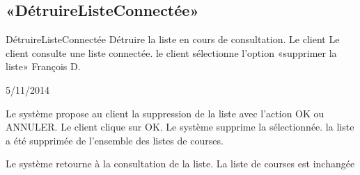 \subsection{«DétruireListeConnectée»}

\startCU
\nom DétruireListeConnectée
\but Détruire la liste en cours de consultation.
\acteur Le client
\precondition Le client consulte une liste connectée.
\declenchement le client sélectionne l'option «supprimer la liste»
\auteur François D.
\date 05/11/2014

\nominal %
\startnominal
\etape Le système propose au client la suppression de la liste avec l'action OK ou ANNULER.
 Le client clique sur OK.
\etape Le système supprime la sélectionnée.
\stopnominal
\postcondition la liste a été supprimée de l'ensemble des listes de courses.


\exception 
{} 
  \etape Le système retourne à la consultation de la liste.
\stopcondition
\postcondition La liste de courses est inchangée
\stopalternatif
\stopCU
